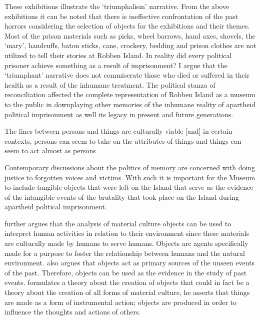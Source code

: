 These exhibitions illustrate the ‘triumphalism’ narrative. From the above exhibitions it can be noted that there is ineffective confrontation of the past horrors considering the selection of objects for the exhibitions and their themes. Most of the prison materials such as picks, wheel barrows, hand axes, shovels, the ‘mary’, handcuffs, baton sticks, cane, crockery, bedding and prison clothes are not utilized to tell their stories at Robben Island. In reality did every political prisoner achieve something as a result of imprisonment? I argue that the ‘triumphant’ narrative does not commiserate those who died or suffered in their health as a result of the inhumane treatment. The political stanza of reconciliation affected the complete representation of Robben Island as a museum to the public in downplaying other memories of the inhumane reality of apartheid political imprisonment as well its legacy in present and future generations.

\begin{IJSRAquote}{\cite[24]{Hoskins_2006}}
    {The lines between persons and things are culturally viable [and] in certain contexts, persons can seem to take on the attributes of things and things can seem to act almost as persons}
\end{IJSRAquote}

Contemporary discussions about the politics of memory are concerned with doing justice to forgotten voices and victims. With such it is important for the Museum to include tangible objects that were left on the Island that serve as the evidence of the intangible events of the brutality that took place on the Island during apartheid political imprisonment.

\textcite{Hoskins_2006} further argues that the analysis of material culture objects can be used to interpret human activities in relation to their environment since these materials are culturally made by humans to serve humans. Objects are agents specifically made for a purpose to foster the relationship between humans and the natural environment.
\textcite[32--35]{Alberti_2000} also argues that objects act as primary sources of the unseen events of the past. Therefore, objects can be used as the evidence in the study of past events.
\textcite{Harrison_2010} formulates a theory about the creation of objects that could in fact be a theory about the creation of all forms of material culture, he asserts that things are made as a form of instrumental action; objects are produced in order to influence the thoughts and actions of others.

